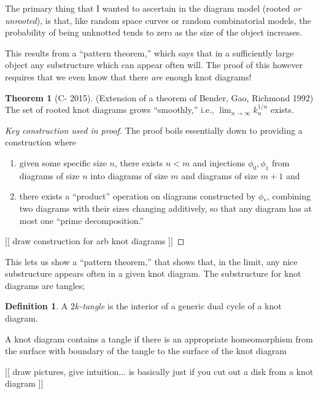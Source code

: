 \documentclass[12pt]{amsart}
\theoremstyle{definition}
\newtheorem*{definition}{Definition}
\newtheorem*{theorem}{Theorem}
\theoremstyle{plain}
\begin{document}
The primary thing that I wanted to ascertain in the diagram model
(rooted \emph{or unrooted}), is that, like random space curves or
random combinatorial models, the probability of being unknotted tends
to zero as the size of the object increases.

This results from a ``pattern theorem,'' which says that in a
sufficiently large object any substructure which can appear often
will. The proof of this however requires that we even know that there
\emph{are} enough knot diagrams!

\begin{theorem}[C- 2015]
  (Extension of a theorem of Bender, Gao, Richmond 1992) The set of
  rooted knot diagrams grows ``smoothly,'' i.e.,
  $\lim_{n\to\infty} k_n^{1/n}$ exists.
\end{theorem}

\begin{proof}[Key construction used in proof]
  The proof boils essentially down to providing a construction where
  \begin{enumerate}
  \item given some specific size $n$, there exists $n < m$ and
    injections $\phi_0, \phi_1$ from diagrams of size $n$ into
    diagrams of size $m$ and diagrams of size $m+1$ and
  \item there exists a ``product'' operation on diagrams constructed
    by $\phi_*$, combining two diagrams with their sizes changing
    additively, so that any diagram has at most one ``prime
    decomposition.''
  \end{enumerate}
[[ draw construction for arb knot diagrams ]]

\vspace{3in}
\end{proof}

This lets us show a ``pattern theorem,'' that shows that, in the
limit, any nice substructure appears often in a given knot
diagram. The substructure for knot diagrams are tangles;

\begin{definition}
  A \emph{$2k$-tangle} is the interior of a generic dual cycle of a
  knot diagram.

  A knot diagram contains a tangle if there is an appropriate
  homeomorphism from the surface with boundary of the tangle to the
  surface of the knot diagram
\end{definition}
[[ draw pictures, give intuition... is basically just if you cut out a
disk from a knot diagram ]]
\end{document}
